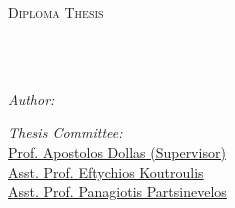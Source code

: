 \documentclass[
12pt, %
english, %
onehalfspacing,
liststotoc, %
headsepline, %
]{MastersDoctoralThesis} %
\author{Christos Spyridakis} %
\begin{document}
\frontmatter %

\pagestyle{plain} %


\begin{titlepage}
\begin{center}

\vspace*{.025 \textheight} %
{\scshape\LARGE \univname\par}\vspace{0.7cm} %
\textsc{\Large Diploma Thesis}\\[0.5cm] %

\HRule \\[0.4cm] %
{\huge \bfseries \ttitle\par}\vspace{0.4cm} %
\HRule \\[0.1cm] %
 
\begin{minipage}[t]{0.3\textwidth}
    \begin{flushleft} \large
        \emph{Author:}\\
        \href{https://www.linkedin.com/in/cspyridakis}{\authorname} %
    \end{flushleft}
\end{minipage}
\begin{minipage}[t]{0.6\textwidth}
    \begin{flushright} \large
        \emph{Thesis Committee:} \\
        \href{https://www.ece.tuc.gr/index.php?id=4531&tx_tuclabspersonnel_list%5Bperson%5D=289&tx_tuclabspersonnel_list%5Baction%5D=person&tx_tuclabspersonnel_list%5Bcontroller%5D=List}{Prof. Apostolos Dollas (Supervisor)}\\ %
        \href{https://www.ece.tuc.gr/index.php?id=4531&tx_tuclabspersonnel_list%5Bperson%5D=79&tx_tuclabspersonnel_list%5Baction%5D=person&tx_tuclabspersonnel_list%5Bcontroller%5D=List}{Asst. Prof. Eftychios Koutroulis}\\ 
        \href{https://www.tuc.gr/index.php?id=5643&tx_tuclabspersonnel_pi3%5Bpersonid%5D=347}{Asst. Prof. Panagiotis Partsinevelos } 
    \end{flushright}
\end{minipage}\\[0.4cm]
 

\end{center}
\end{titlepage}
\end{document}
